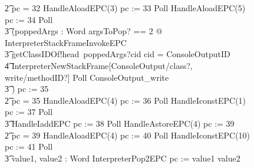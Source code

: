 \begin{figure}[tp!]
{\begin{circus}
    \t2 {} \circelse pc = 32 \circthen HandleAloadEPC(3) \circseq pc := 33 \circseq Poll \circseq HandleAloadEPC(5) \circseq pc := 34 \circseq Poll \circseq \\
    \t3 (\circvar poppedArgs : Word \circspot \lschexpract \exists argsToPop? == 2 @ InterpreterStackFrameInvokeEPC \rschexpract \circseq \\
    \t3 getClassIDOf!head~poppedArgs?cid \then \circif cid = ConsoleOutputID \circthen {} \\
    \t4 \lschexpract InterpreterNewStackFrame[ConsoleOutput/class?, write/methodID?] \rschexpract \circseq  Poll \circseq ConsoleOutput\_write \\
    \t3 \circfi) \circseq pc := 35 \\
    \t2 {} \circelse pc = 35 \circthen HandleAloadEPC(4) \circseq pc := 36 \circseq Poll \circseq HandleIconstEPC(1) \circseq pc := 37 \circseq Poll \circseq \\
    \t3 HandleIaddEPC \circseq pc := 38 \circseq Poll \circseq HandleAstoreEPC(4) \circseq pc := 39 \\
    \t2 {} \circelse pc = 39 \circthen HandleAloadEPC(4) \circseq pc := 40 \circseq Poll \circseq HandleIconstEPC(10) \circseq  pc := 41 \circseq Poll \circseq \\
    \t3 \circvar value1, value2 : Word \circspot InterpreterPop2EPC \circseq pc := \IF value1 \leq value2   \\

\end{circus}}
\end{figure}
